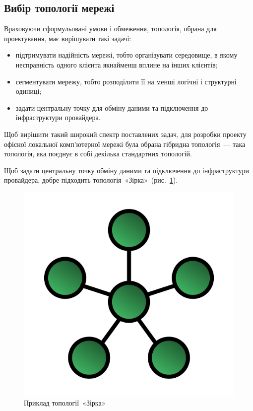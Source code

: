 \documentclass[
  ukrainian,
  simple,
]{eskdnaukvd}
\newlength{\gridunitwidth}
\begin{document}
    \subsection{Вибір топології мережі}

      Враховуючи сформульовані умови і обмеження, топологія, обрана для проектування, має вирішувати такі задачі:
      \begin{itemize}
        \item підтримувати надійність мережі, тобто організувати середовище, в якому несправність одного клієнта якнайменш вплине на інших клієнтів;
        \item сегментувати мережу, тобто розподілити її на менші логічні і структурні одиниці;
        \item задати центральну точку для обміну даними та підключення до інфраструктури провайдера.
      \end{itemize}
      Щоб вирішити такий широкий спектр поставлених задач, для розробки проекту офісної локальної комп'\-ю\-тер\-ної мережі була обрана гібридна топологія~— така топологія, яка поєднує в собі декілька стандартних топологій.

      Щоб задати центральну точку обміну даними та підключення до інфраструктури провайдера, добре підходить топологія~«Зірка»~(рис.~\ref{fig:topology-star}).

      \begin{figure}[!htbp]
        \centering
        \includegraphics[width = 4 \gridunitwidth]{./assets/02-topology-star.png}
        \caption{Приклад топології~«Зірка»}
        \label{fig:topology-star}
      \end{figure}
\end{document}
